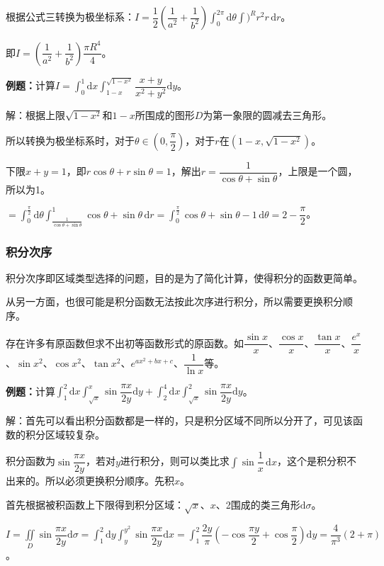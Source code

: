 \documentclass[UTF8, 12pt]{ctexart}
\begin{document}
根据公式三转换为极坐标系：$I=\dfrac{1}{2}\left(\dfrac{1}{a^2}+\dfrac{1}{b^2}\right)\int_0^{2\pi}\textrm{d}\theta\int)^Rr^2r\,\textrm{d}r$。

即$I=\left(\dfrac{1}{a^2}+\dfrac{1}{b^2}\right)\dfrac{\pi R^4}{4}$。

\textbf{例题：}计算$I=\int_0^1\textrm{d}x\int_{1-x}^{\sqrt{1-x^2}}\dfrac{x+y}{x^2+y^2}\textrm{d}y$。

解：根据上限$\sqrt{1-x^2}$和$1-x$所围成的图形$D$为第一象限的圆减去三角形。

所以转换为极坐标系时，对于$\theta\in\left(0,\dfrac{\pi}{2}\right)$，对于$r$在$(1-x,\sqrt{1-x^2})$。

下限$x+y=1$，即$r\cos\theta+r\sin\theta=1$，解出$r=\dfrac{1}{\cos\theta+\sin\theta}$，上限是一个圆，所以为1。

$=\int_0^\frac{\pi}{2}\textrm{d}\theta\int_\frac{1}{\cos\theta+\sin\theta}^1\cos\theta+\sin\theta\,\textrm{d}r=\int_0^\frac{\pi}{2}\cos\theta+\sin\theta-1\,\textrm{d}\theta=2-\dfrac{\pi}{2}$。

\subsubsection{积分次序}

积分次序即区域类型选择的问题，目的是为了简化计算，使得积分的函数更简单。

从另一方面，也很可能是积分函数无法按此次序进行积分，所以需要更换积分顺序。

存在许多有原函数但求不出初等函数形式的原函数。如$\dfrac{\sin x}{x}$、$\dfrac{\cos x}{x}$、$\dfrac{\tan x}{x}$、$\dfrac{e^x}{x}$、$\sin x^2$、$\cos x^2$、$\tan x^2$、$e^{ax^2+bx+c}$、$\dfrac{1}{\ln x}$等。

\textbf{例题：}计算$\displaystyle{\int_1^2\textrm{d}x\int_{\sqrt{x}}^x\sin\dfrac{\pi x}{2y}\textrm{d}y+\int_2^4\textrm{d}x\int_{\sqrt{x}}^2\sin\dfrac{\pi x}{2y}\textrm{d}y}$。

解：首先可以看出积分函数都是一样的，只是积分区域不同所以分开了，可见该函数的积分区域较复杂。

积分函数为$\sin\dfrac{\pi x}{2y}$，若对$y$进行积分，则可以类比求$\displaystyle{\int\sin\dfrac{1}{x}\,\textrm{d}x}$，这个是积分积不出来的。所以必须更换积分顺序。先积$x$。

首先根据被积函数上下限得到积分区域：$\sqrt{x}$、$x$、2围成的类三角形$\textrm{d}\sigma$。

$I=\displaystyle{\iint\limits_D\sin\dfrac{\pi x}{2y}\textrm{d}\sigma}=\displaystyle{\int_1^2\textrm{d}y\int_y^{y^2}\sin\dfrac{\pi x}{2y}\textrm{d}x}=\displaystyle{\int_1^2\dfrac{2y}{\pi}\left(-\cos\dfrac{\pi y}{2}+\cos\dfrac{\pi}{2}\right)}\textrm{d}y=\dfrac{4}{\pi^3}(2+\pi)$。
\end{document}
